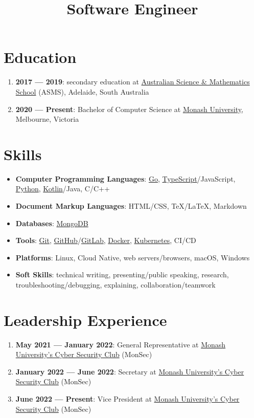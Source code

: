 \documentclass[a4paper, 10pt, roman, colorlinks, linkcolor=purple, filecolor=purple, citecolor=blue, urlcolor=blue]{moderncv}
\title{Software Engineer}
\begin{document}
	\maketitle
	\section{Education}
	\begin{enumerate}
		\item \textbf{2017 --- 2019}: secondary education at \href{https://asms.sa.edu.au}{Australian Science \& Mathematics School} (ASMS), Adelaide, South Australia
		\item \textbf{2020 --- Present}: Bachelor of Computer Science at \href{https://www.monash.edu/it}{Monash University}, Melbourne, Victoria
	\end{enumerate}

	\section{Skills}
	\begin{itemize}
		\item \textbf{Computer Programming Languages}: \href{https://go.dev}{Go}, \href{https://typescriptlang.org}{TypeScript}/JavaScript, \href{https://python.org}{Python}, \href{https://kotlinlang.org}{Kotlin}/Java, C/C++
		\item \textbf{Document Markup Languages}: HTML/CSS, \TeX/\LaTeX, Markdown
		\item \textbf{Databases}: \href{https://www.mongodb.com}{MongoDB}
		\item \textbf{Tools}: \href{https://git-scm.com}{Git}, \href{https://github.com}{GitHub}/\href{https://gitlab.com}{GitLab}, \href{https://www.docker.com}{Docker}, \href{https://kubernetes.io}{Kubernetes}, CI/CD
		\item \textbf{Platforms}: Linux, Cloud Native, web servers/browsers, macOS, Windows
		\item \textbf{Soft Skills}: technical writing, presenting/public speaking, research, troubleshooting/debugging, explaining, collaboration/teamwork
	\end{itemize}

	\section{Leadership Experience}
	\begin{enumerate}
		\item \textbf{May 2021 --- January 2022}: General Representative at \href{https://monsec.io/team/}{Monash University's Cyber Security Club} (MonSec)
		\item \textbf{January 2022 --- June 2022}: Secretary at \href{https://monsec.io/team/}{Monash University's Cyber Security Club} (MonSec)
		\item \textbf{June 2022 --- Present}: Vice President at \href{https://monsec.io/team/}{Monash University's Cyber Security Club} (MonSec)
	\end{enumerate}
\end{document}

